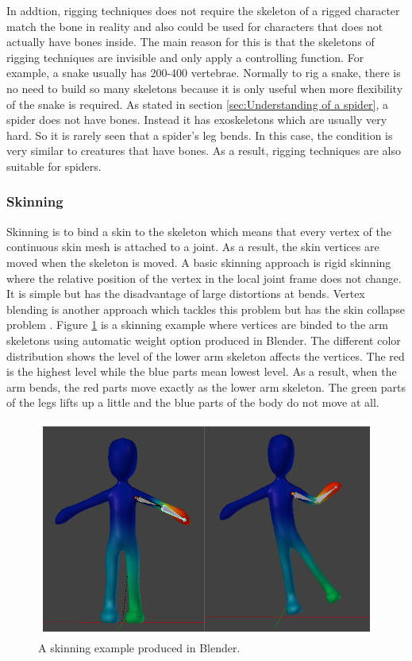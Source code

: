 In addtion, rigging techniques does not require the skeleton of a rigged character match the bone in reality and also could be used for characters that does not actually have bones inside. The main reason for this is that the skeletons of rigging techniques are invisible and only apply a controlling function. For example, a snake usually has 200-400 vertebrae. Normally to rig a snake, there is no need to build so many skeletons because it is only useful when more flexibility of the snake is required. As stated in section \ref{sec:Understanding of a spider}, a spider does not have bones. Instead it has exoskeletons which are usually very hard. So it is rarely seen that a spider's leg bends. In this case, the condition is very similar to creatures that have bones. As a result, rigging techniques are also suitable for spiders.

\subsubsection{Skinning}
Skinning is to bind a skin to the skeleton which means that every
vertex of the continuous skin mesh is attached to a joint. As a
result, the skin vertices are moved when the skeleton is moved.
A basic skinning approach is rigid skinning where the relative
position of the vertex in the local joint frame does not change. It is simple but has the disadvantage
of large distortions at bends. Vertex blending is another approach
which tackles this problem but has the skin collapse problem
\cite{skinning1}. Figure \ref{fig:skinning} is a skinning example where vertices are binded to the arm 
skeletons using automatic weight option produced in Blender. The different color distribution shows the level of the lower arm skeleton affects the vertices. The red is the highest level while the blue parts mean lowest level. As a result, when the arm bends, the red parts move exactly as the lower arm skeleton. The green parts of the legs lifts up a little and the blue parts of the body do not move at all.

\begin{figure}[ht!]
\centering
\includegraphics[width=12cm]{figures/skinning.png}
\caption{A skinning example produced in Blender.}
\label{fig:skinning}
\end{figure}


